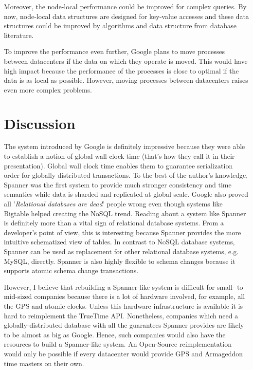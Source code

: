 \documentclass[onecolumn, a4paper, 10pt]{article}
\begin{document}
Moreover, the node-local performance could be improved for complex queries. By
now, node-local data structures are designed for key-value accesses and these data
structures could be improved by algorithms and data structure from database
literature.

To improve the performance even further, Google plans to move processes between
datacenters if the data on which they operate is moved. This would have high
impact because the performance of the processes is close to optimal if the data
is as local as possible. However, moving processes between datacenters raises
even more complex problems.

\section{Discussion}
\label{sec:discussion}

The system introduced by Google is definitely impressive because they were able
to establish a notion of global wall clock time (that's how they call it in their
presentation). Global wall clock time enables them to guarantee serialization order
for globally-distributed transactions. To the best of the author's knowledge,
Spanner was the first system to provide much stronger consistency and time
semantics while data is sharded and replicated at global scale. Google also proved
all '\emph{Relational databases are dead}' people wrong even though systems like
Bigtable helped creating the NoSQL trend. Reading about a system like Spanner is
definitely more than a vital sign of relational database systems. From a
developer's point of view, this is interesting because Spanner provides
the more intuitive schematized view of tables. In contrast to NoSQL database
systems, Spanner can be used as replacement for other relational database
systems, e.g. MySQL, directly. Spanner is also highly flexible to schema changes
because it supports atomic schema change transactions.

However, I believe that rebuilding a Spanner-like system is difficult for
small- to mid-sized companies because there is a lot of hardware involved, for
example, all the GPS and atomic clocks. Unless this hardware infrastructure is
available it is hard to reimplement the TrueTime API. Nonetheless,
companies which need a globally-distributed database with all the guarantees
Spanner provides are likely to be almost as big as Google. Hence, such companies
would also have the resources to build a Spanner-like system. An Open-Source
reimplementation would only be possible if every datacenter would provide GPS
and Armageddon time masters on their own.
\end{document}
